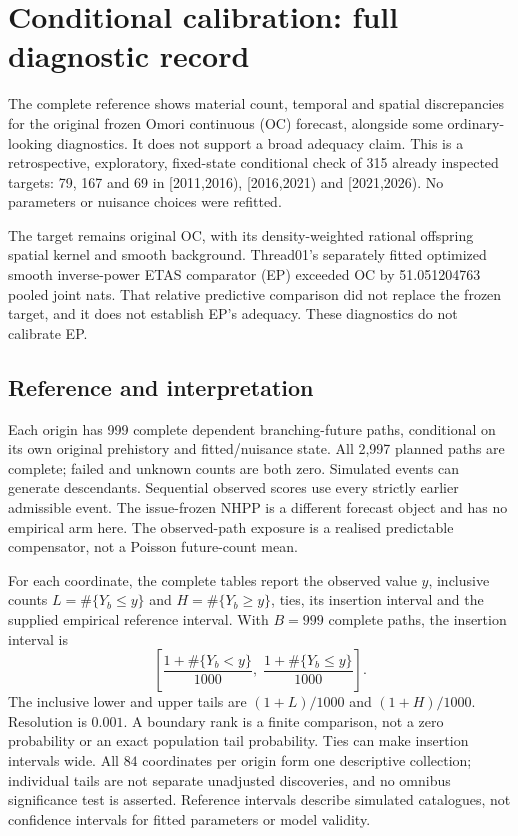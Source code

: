 \section{Conditional calibration: full diagnostic record}\label{app:audit12}


The complete reference shows material count, temporal and spatial discrepancies for the original frozen Omori continuous (OC) forecast, alongside some ordinary-looking diagnostics. It does not support a broad adequacy claim. This is a retrospective, exploratory, fixed-state conditional check of 315 already inspected targets: 79, 167 and 69 in [2011,2016), [2016,2021) and [2021,2026). No parameters or nuisance choices were refitted.

The target remains original OC, with its density-weighted rational offspring spatial kernel and smooth background. Thread01's separately fitted optimized smooth inverse-power ETAS comparator (EP) exceeded OC by 51.051204763 pooled joint nats. That relative predictive comparison did not replace the frozen target, and it does not establish EP's adequacy. These diagnostics do not calibrate EP.

\subsection{Reference and interpretation}

Each origin has 999 complete dependent branching-future paths, conditional on its own original prehistory and fitted/nuisance state. All 2,997 planned paths are complete; failed and unknown counts are both zero. Simulated events can generate descendants. Sequential observed scores use every strictly earlier admissible event. The issue-frozen NHPP is a different forecast object and has no empirical arm here. The observed-path exposure is a realised predictable compensator, not a Poisson future-count mean.

For each coordinate, the complete tables report the observed value $y$, inclusive counts $L=\#\{Y_b\leq y\}$ and $H=\#\{Y_b\geq y\}$, ties, its insertion interval and the supplied empirical reference interval. With $B=999$ complete paths, the insertion interval is
\[
 \left[\frac{1+\#\{Y_b<y\}}{1000},\;
       \frac{1+\#\{Y_b\leq y\}}{1000}\right].
\]
The inclusive lower and upper tails are $(1+L)/1000$ and $(1+H)/1000$. Resolution is $0.001$. A boundary rank is a finite comparison, not a zero probability or an exact population tail probability. Ties can make insertion intervals wide. All $84$ coordinates per origin form one descriptive collection; individual tails are not separate unadjusted discoveries, and no omnibus significance test is asserted. Reference intervals describe simulated catalogues, not confidence intervals for fitted parameters or model validity.

